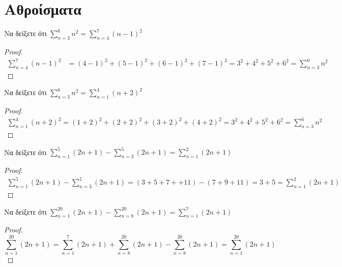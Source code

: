 \documentclass[main.tex]{subfiles}
\begin{document}
\section{Αθροίσματα}


\begin{example}
    Να δείξετε ότι $ \sum_{n=3}^{6} n^{2} = \sum_{n=4}^{7} (n-1)^{2}   $
\end{example}

\begin{proof}
    \begin{align*}
        \sum_{n=4}^{7} (n-1)^{2} &= (4-1)^{2}+(5-1)^{2}+(6-1)^{2}+(7-1)^{2} 
        = 3^{2}+4^{2}+5^{2}+6^{2} = \sum_{n=3}^{6} n^{2} 
    \end{align*}
\end{proof}

\begin{example}
    Να δείξετε ότι $ \sum_{n=3}^{6} n^{2} = \sum_{n=1}^{4} (n+2)^{2}   $
\end{example}

\begin{proof}
    \begin{align*}
        \sum_{n=1}^{4} (n+2)^{2} = (1+2)^{2}+(2+2)^{2}+(3+2)^{2}+(4+2)^{2}=
        3^{2}+4^{2}+5^{2}+6^{2} = \sum_{n=3}^{6} n^{2} 
    \end{align*}
\end{proof}

\begin{example}
    Να δείξετε ότι $ \sum_{n=1}^{5} (2n+1) - \sum_{n=3}^{5} (2n+1)  =  
    \sum_{n=1}^{2} (2n+1) $
\end{example}

\begin{proof}
    \begin{align*}
        \sum_{n=1}^{5} (2n+1)- \sum_{n=3}^{5} (2n+1) = 
        (3+5+7++11) - (7+9+11) = 3 + 5 = \sum_{n=1}^{2} (2n+1) 
    \end{align*}
\end{proof}

\begin{example}
    Να δείξετε ότι $ \sum_{n=1}^{20} (2n+1) - \sum_{n=8}^{20} (2n+1) = \sum_{n=1}^{7} 
    (2n+1) $ 
\end{example}
\begin{proof}
        \item 
            \[
                \sum_{n=1}^{20} (2n+1) = \sum_{n=1}^{7} (2n+1) + 
                \sum_{n=8}^{20} (2n+1) - \sum_{n=8}^{20} (2n+1) = 
                \sum_{n=1}^{20} (2n+1)
            \]
\end{proof}
\end{document}
